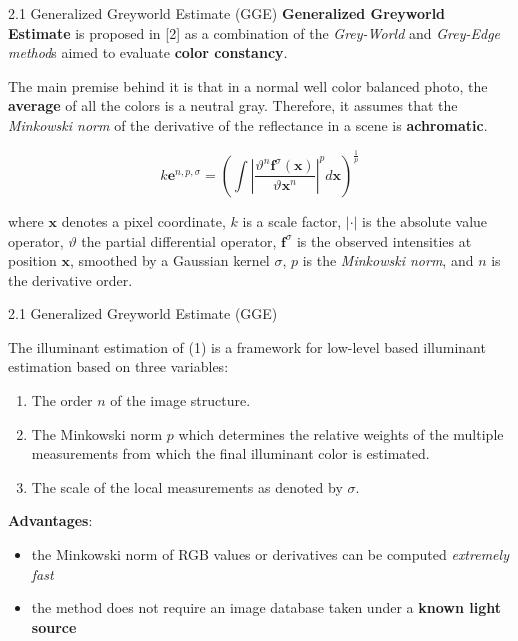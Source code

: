 \begin{tframe}{2.1 Generalized Greyworld Estimate (GGE)}
\textbf{Generalized Greyworld Estimate} is proposed in [2] as a combination of the \emph{Grey-World} and \emph{Grey-Edge method}s aimed to evaluate \textbf{color constancy}.

\vspace{0.3cm}
The main premise behind it is that in a normal well color balanced photo, the \textbf{average} of all the colors is a neutral gray. Therefore, it assumes that the \emph{Minkowski norm} of the derivative of the reflectance in a scene is \textbf{achromatic}.

\begin{equation}
k\textbf{e}^{n, p, \sigma} = (\int |\frac{\vartheta^{n}\textbf{f}^{\sigma}(\textbf{x})}{\vartheta\textbf{x}^{n}}|^{p}  d\textbf{x})^{\frac{1}{p}}
\end{equation}
\begin{footnotesize}
where $\textbf{x}$ denotes a pixel coordinate, $k$ is a scale factor, $|\cdot|$ is the absolute value operator, $\vartheta$ the partial differential operator, $\textbf{f}^{\sigma}$ is the observed intensities at position $\textbf{x}$, smoothed by a Gaussian kernel $\sigma$, $p$ is the \emph{Minkowski norm}, and $n$ is the derivative order.
\end{footnotesize}
\end{tframe}

\begin{tframe}{2.1 Generalized Greyworld Estimate (GGE)}

The illuminant estimation of (1) is a framework for low-level based illuminant estimation based on three variables:
\begin{enumerate}
\item The order $n$ of the image structure.
\item The Minkowski norm $p$ which determines the relative weights of the multiple measurements from which the final illuminant color is estimated.
\item The scale of the local measurements as denoted by $\sigma$.
\end{enumerate}
\vspace{0.2cm}
\textbf{Advantages}:
\begin{itemize}
\item the Minkowski norm of RGB values or derivatives can be computed\emph{ extremely fast}
\item the method does not require an image database taken under a \textbf{known light source}
\end{itemize}

\end{tframe}


